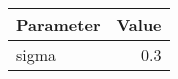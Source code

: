 \begin{tabular}{lr}
\hline
 Parameter   &   Value \\
\hline
 sigma       &     0.3 \\
\hline
\end{tabular}